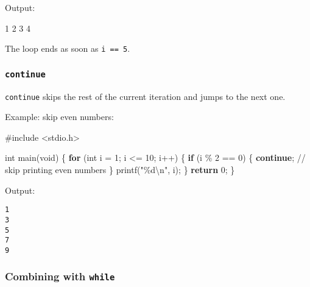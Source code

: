 \documentclass[
  letterpaper,
  DIV=11,
  numbers=noendperiod]{scrreprt}
\newenvironment{Shaded}{\begin{snugshade}}{\end{snugshade}}
\newcommand{\CommentTok}[1]{\textcolor[rgb]{0.37,0.37,0.37}{#1}}
\newcommand{\ControlFlowTok}[1]{\textcolor[rgb]{0.00,0.23,0.31}{\textbf{#1}}}
\newcommand{\DataTypeTok}[1]{\textcolor[rgb]{0.68,0.00,0.00}{#1}}
\newcommand{\DecValTok}[1]{\textcolor[rgb]{0.68,0.00,0.00}{#1}}
\newcommand{\ExtensionTok}[1]{\textcolor[rgb]{0.00,0.23,0.31}{#1}}
\newcommand{\ImportTok}[1]{\textcolor[rgb]{0.00,0.46,0.62}{#1}}
\newcommand{\NormalTok}[1]{\textcolor[rgb]{0.00,0.23,0.31}{#1}}
\newcommand{\OperatorTok}[1]{\textcolor[rgb]{0.37,0.37,0.37}{#1}}
\newcommand{\PreprocessorTok}[1]{\textcolor[rgb]{0.68,0.00,0.00}{#1}}
\newcommand{\SpecialCharTok}[1]{\textcolor[rgb]{0.37,0.37,0.37}{#1}}
\newcommand{\StringTok}[1]{\textcolor[rgb]{0.13,0.47,0.30}{#1}}
\begin{document}
Output:

\begin{Shaded}
\begin{Highlighting}[]
\ExtensionTok{1}
\ExtensionTok{2}
\ExtensionTok{3}
\ExtensionTok{4}
\end{Highlighting}
\end{Shaded}

The loop ends as soon as \texttt{i\ ==\ 5}.

\subsubsection{\texorpdfstring{\texttt{continue}}{continue}}\label{continue}

\texttt{continue} skips the rest of the current iteration and jumps to
the next one.

Example: skip even numbers:

\begin{Shaded}
\begin{Highlighting}[]
\PreprocessorTok{\#include }\ImportTok{\textless{}stdio.h\textgreater{}}

\DataTypeTok{int}\NormalTok{ main}\OperatorTok{(}\DataTypeTok{void}\OperatorTok{)} \OperatorTok{\{}
    \ControlFlowTok{for} \OperatorTok{(}\DataTypeTok{int}\NormalTok{ i }\OperatorTok{=} \DecValTok{1}\OperatorTok{;}\NormalTok{ i }\OperatorTok{\textless{}=} \DecValTok{10}\OperatorTok{;}\NormalTok{ i}\OperatorTok{++)} \OperatorTok{\{}
        \ControlFlowTok{if} \OperatorTok{(}\NormalTok{i }\OperatorTok{\%} \DecValTok{2} \OperatorTok{==} \DecValTok{0}\OperatorTok{)} \OperatorTok{\{}
            \ControlFlowTok{continue}\OperatorTok{;}  \CommentTok{// skip printing even numbers}
        \OperatorTok{\}}
\NormalTok{        printf}\OperatorTok{(}\StringTok{"}\SpecialCharTok{\%d\textbackslash{}n}\StringTok{"}\OperatorTok{,}\NormalTok{ i}\OperatorTok{);}
    \OperatorTok{\}}
    \ControlFlowTok{return} \DecValTok{0}\OperatorTok{;}
\OperatorTok{\}}
\end{Highlighting}
\end{Shaded}

Output:

\begin{verbatim}
1
3
5
7
9
\end{verbatim}

\subsubsection{\texorpdfstring{Combining with
\texttt{while}}{Combining with while}}\label{combining-with-while}
\end{document}
